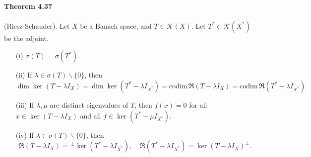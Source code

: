\documentclass{article}
\begin{document}
\paragraph{Theorem 4.37\label{thm:4.37}} (Riesz-Schauder). Let $X$ be a Banach space, and $T\in\mathcal{K}(X)$. Let $T^*\in\mathcal{K}(X^*)$ be the adjoint.
\begin{itemize}
	\item[(i)] $\sigma(T)=\sigma(T^*)$.
	\item[(ii)] If $\lambda\in\sigma(T)\backslash\{0\}$, then $$\dim\ker(T-\lambda I_X) = \dim\ker(T^*-\lambda I_{X^*}) = \mathrm{codim}\,\mathfrak{R}(T-\lambda I_X) = \mathrm{codim}\,\mathfrak{R}(T^*-\lambda I_{X^*}).$$
	\item[(iii)] If $\lambda,\mu$ are distinct eigenvalues of $T$, then $f(x)=0$ for all $x\in\ker(T-\lambda I_X)$ and all $f\in\ker(T^*-\mu I_{X^*})$.
	\item[(iv)] If $\lambda\in\sigma(T)\backslash\{0\}$, then $$\mathfrak{R}(T-\lambda I_X) =\,^\perp\ker(T^*-\lambda I_{X^*}),\quad \mathfrak{R}(T^*-\lambda I_{X^*})= \ker(T-\lambda I_X)^\perp.$$
\end{itemize}
\end{document}
